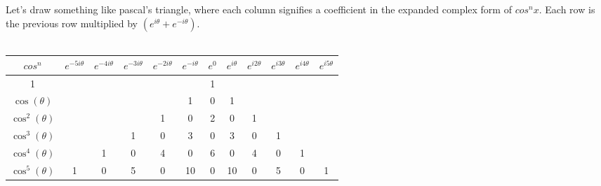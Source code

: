 \documentclass[12pt]{article}
\begin{document}
Let's draw something like pascal's triangle, where each column signifies a coefficient in the expanded complex form of $cos^nx$. 
Each row is the previous row multiplied by $(e^{i\theta} + e^{-i\theta})$.
\\
\\
\begin{tabular}{|c|c|c|c|c|c|c|c|c|c|c|c|}
\hline
$cos^n$ & $e^{-5i\theta}$ & $e^{-4i\theta}$ & $e^{-3i\theta}$ & $e^{-2i\theta}$ & $e^{-i\theta}$ & $e^0$ & $e^{i\theta}$ & $e^{i2\theta}$ & $e^{i3\theta}$ & $e^{i4\theta}$ & $e^{i5\theta}$
\\
\hline
1 &  &  &  &  &  & 1 &  &  &  &  & 
\\
\hline
$\cos(\theta)$ &  &  &  &  & 1 & 0 & 1 &  &  &  & 
\\
\hline
$\cos^2(\theta)$ &  &  &  & 1 & 0 & 2 & 0 & 1 &  &  & 
\\
\hline
$\cos^3(\theta)$ &  &  & 1 & 0 & 3 & 0 & 3 & 0 & 1 &  & 
\\
\hline
$\cos^4(\theta)$ &  & 1 & 0 & 4 & 0 & 6 & 0 & 4 & 0 & 1 & 
\\
\hline
$\cos^5(\theta)$ & 1 & 0 & 5 & 0 & 10 & 0 & 10 & 0 & 5 & 0 & 1
\\
\hline
\end{tabular}
\end{document}

